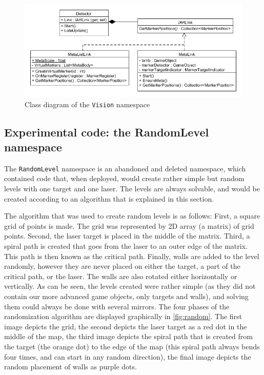 			\begin{figure}[ht]
				\includegraphics[width=\textwidth]{ClassDiagramVision}
				\caption{Class diagram of the \texttt{Vision} namespace}
				\label{fig:classdiagramvision}
			\end{figure}
			
		\subsection{Experimental code: the RandomLevel namespace} \label{ssec:randomlevelnamespace}
			The \texttt{RandomLevel} namespace is an abandoned and deleted
			namespace, which contained code that, when deployed, would create
			rather simple but random levels with one target and one laser.
			The levels are always solvable, and would be created according 
			to an algorithm that is explained in this section.
			
			The algorithm that was used to create random levels is as follows:
			First, a square grid of points is made. The grid was represented by
			2D array (a matrix) of grid points. Second, the laser target is
			placed in the middle of the matrix. Third, a spiral path is created that
			goes from the laser to an outer edge of the matrix. This path is then
			known as the critical path. Finally, walls are added to the level randomly,
			however they are never placed on either the target, a part of the
			critical path, or the laser. The walls are also rotated either
			horizontally or vertically. As can be seen, the levels created were
			rather simple (as they did not contain our more advanced game
			objects, only targets and walls), and solving them could always be done
			with several mirrors. The four phases of the randomization algorithm
			are displayed graphically in \ref{fig:random}. The first image depicts
			the grid, the second depicts the laser target as a red dot in the
			middle of the map, the third image depicts the spiral path that
			is created from the target (the orange dot) to the edge of the map 
			(this spiral path always bends four times, and can start in any 
			random direction), the final image depicts the random placement of
			walls as purple dots.
			
